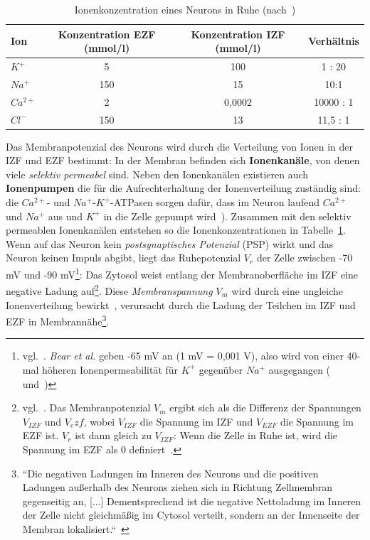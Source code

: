 {\renewcommand{\arraystretch}{1.5}%
\begin{table} %
 \centering
 \begin{tabular}{l | c | c | c }
  \textbf{Ion} & \textbf{Konzentration EZF (mmol/l)} & \textbf{Konzentration IZF (mmol/l)} & \textbf{Verhältnis} \\
  \hline
  $K^+$      & 5 & 100 & 1 : 20 \\
  $Na^+$     & 150 & 15 & 10:1 \\
  $Ca^{2+}$  & 2 & 0,0002 & 10000 : 1 \\
  $Cl^-$     & 150 & 13 & 11,5 : 1 \\
 \end{tabular}
 \caption{Ionenkonzentration eines Neurons in Ruhe (nach~\cite[75, Abb. 3.15]{BCP18})}
 \label{tab:ionenkonzentration}
\end{table}


Das Membranpotenzial des Neurons wird durch die Verteilung von Ionen in der IZF und EZF bestimmt: In der Membran befinden sich \textbf{Ionenkanäle}, von denen viele \textit{selektiv permeabel} sind.
Neben den Ionenkanälen existieren auch \textbf{Ionenpumpen} die für die Aufrechterhaltung der Ionenverteilung zuständig sind: die $Ca^{2+}$- und $Na^+$-$K^+$-ATPasen sorgen dafür, dass im Neuron laufend  $Ca^{2+}$ und $Na^+$ aus und $K^+$ in die Zelle gepumpt wird~\cite[44]{SD07}).
Zusammen mit den selektiv permeablen Ionenkanälen entstehen so die Ionenkonzentrationen in Tabelle~\ref{tab:ionenkonzentration}.\\


Wenn auf das Neuron kein \textit{postsynaptisches Potenzial} (PSP) wirkt und das Neuron keinen Impuls abgibt, liegt das Ruhepotenzial $V_r$ der Zelle zwischen -70 mV und -90 mV\footnote{
   vgl.~\cite[47, Tafel 2.3 (A.1)]{SD07}. \textit{Bear et al.} geben -65 mV an (1 mV = 0,001 V), also wird von einer 40-mal höheren Ionenpermeabilität für $K^+$ gegenüber $Na^+$ ausgegangen (~\cite[74, Exkurs 3.2]{BCP18} und~\cite[70]{BCP18})
}: Das Zytosol weist entlang der Membranoberfläche im IZF eine negative Ladung auf\footnote{
 vgl.~\cite[61]{BCP18}. Das Membranpotenzial $V_m$ ergibt sich als die Differenz der Spannungen $V_{IZF}$ und $V_ezf$, wobei $V_{IZF}$ die Spannung im IZF und $V_{EZF}$ die Spannung im EZF ist. $V_r$ ist dann gleich zu $V_{IZF}$: Wenn die Zelle in Ruhe ist, wird die Spannung im EZF als $0$ definiert~\cite[127]{KSJ+13}.
}.
Diese \textit{Membranspannung} $V_m$ wird durch eine ungleiche Ionenverteilung bewirkt~\cite[66]{FE19}, verursacht durch die Ladung der Teilchen im IZF und EZF in Membrannähe\footnote{
 ``Die negativen Ladungen im Inneren des Neurons und die positiven Ladungen außerhalb des Neurons ziehen sich in Richtung Zellmembran gegenseitig an, {[...]} Dementsprechend ist die negative Nettoladung im Inneren der Zelle nicht gleichmäßig im Cytosol verteilt, sondern an der Innenseite der Membran lokalisiert.``~\cite[72, Punkt 2]{BCP18}
}.


}
